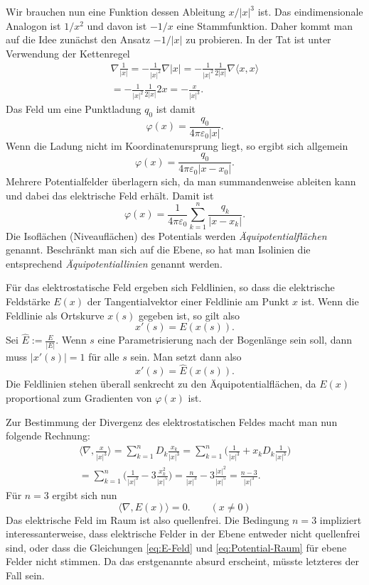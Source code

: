 \documentclass[a4paper,10pt,fleqn,twocolumn,twoside]{article}
\begin{document}
Wir brauchen nun eine Funktion dessen Ableitung
$x/|x|^3$ ist. Das eindimensionale Analogon
ist $1/x^2$ und davon ist $-1/x$ eine Stammfunktion.
Daher kommt man auf die Idee zunächst den Ansatz
$-1/|x|$ zu probieren. In der Tat ist
unter Verwendung der Kettenregel
\begin{gather*}
\nabla\frac{1}{|x|} = -\frac{1}{|x|^2}\nabla |x|
= -\frac{1}{|x|^2}\frac{1}{2|x|}\nabla\langle x,x\rangle\\
= -\frac{1}{|x|^2}\frac{1}{2|x|}2x
= -\frac{x}{|x|^3}.
\end{gather*}
Das Feld um eine Punktladung $q_0$ ist damit
\begin{equation}\label{eq:Potential-Raum}
\varphi(x) = \frac{q_0}{4\pi\varepsilon_0|x|}.
\end{equation}
Wenn die Ladung nicht im Koordinatenursprung liegt, so ergibt
sich allgemein
\[\varphi(x) = \frac{q_0}{4\pi\varepsilon_0|x-x_0|}.\]
Mehrere Potentialfelder überlagern sich, da man summandenweise
ableiten kann und dabei das elektrische Feld erhält.
Damit ist
\[\varphi(x) = \frac{1}{4\pi\varepsilon_0}
\sum_{k=1}^n \frac{q_k}{|x-x_k|}.\]
Die Isoflächen (Niveauflächen)
des Potentials werden \emph{Äquipotentialflächen} genannt.
Beschränkt man sich auf die Ebene, so hat man Isolinien die
entsprechend \emph{Äquipotentiallinien} genannt werden.

Für das elektrostatische Feld ergeben sich Feldlinien, so dass
die elektrische Feldstärke $E(x)$ der Tangentialvektor
einer Feldlinie am Punkt $x$ ist. Wenn die Feldlinie als
Ortskurve $x(s)$ gegeben ist, so gilt also
\[x'(s)=E(x(s)).\]
Sei $\hat E:=\frac{E}{|E|}$. Wenn $s$ eine Parametrisierung nach
der Bogenlänge sein soll, dann muss $|x'(s)|=1$ für alle $s$ sein.
Man setzt dann also
\[x'(s)=\hat E(x(s)).\]
Die Feldlinien stehen überall senkrecht zu den Äquipotentialflächen,
da $E(x)$ proportional zum Gradienten von $\varphi(x)$ ist.

Zur Bestimmung der Divergenz des elektrostatischen Feldes macht man
nun folgende Rechnung:
\begin{gather*}
\langle\nabla,\frac{x}{|x|^3}\rangle
= \sum_{k=1}^n D_k\frac{x_k}{|x|^3}
= \sum_{k=1}^n \bigg(\frac{1}{|x|^3}+x_kD_k\frac{1}{|x|^3}\bigg)\\
= \sum_{k=1}^n \bigg(\frac{1}{|x|^3}-3\frac{x_k^2}{|x|^5}\bigg)
= \frac{n}{|x|^3}-3\frac{|x|^2}{|x|^5}
= \frac{n-3}{|x|^3}.
\end{gather*}
Für $n=3$ ergibt sich nun
\begin{equation}\label{eq:quellenfrei}
\langle\nabla,E(x)\rangle = 0.\qquad (x\ne 0)
\end{equation}
Das elektrische Feld im Raum ist also quellenfrei.
Die Bedingung $n=3$ impliziert interessanterweise, dass elektrische
Felder in der Ebene entweder nicht quellenfrei sind, oder dass
die Gleichungen \eqref{eq:E-Feld} und \eqref{eq:Potential-Raum} für
ebene Felder nicht stimmen. Da das erstgenannte absurd erscheint,
müsste letzteres der Fall sein.
\end{document}
